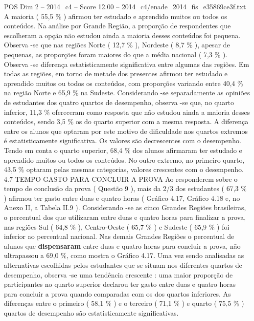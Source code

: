\begin{textsample}{POS Dim 2 – 2014\_c4 – Score 12.00 – 2014\_c4/enade\_2014\_fis\_e35869ce3f.txt}
A maioria ( 55,5 \% ) afirmou ter estudado e aprendido muitos ou todos os conteúdos.
Na análise por Grande Região, a proporção de respondentes que escolheram a opção não estudou ainda a maioria desses conteúdos foi pequena.
Observa -se que nas regiões Norte ( 12,7 \% ), Nordeste ( 8,7 \% ), apesar de pequenas, as proporções foram maiores do que a média nacional ( 7,3 \% ).
Observa -se diferença estatisticamente significativa entre algumas das regiões.
Em todas as regiões, em torno de metade dos presentes afirmou ter estudado e aprendido muitos ou todos os conteúdos, com proporções variando entre 40,4 \% na região Norte e 65,9 \% na Sudeste.
Considerando -se separadamente as opiniões de estudantes dos quatro quartos de desempenho, observa -se que, no quarto inferior, 11,3 \% ofereceram como resposta que não estudou ainda a maioria desses conteúdos, sendo 3,5 \% os do quarto superior com a mesma resposta.
A diferença entre os alunos que optaram por este motivo de dificuldade nos quartos extremos é estatisticamente significativa.
Os valores são decrescentes com o desempenho.
Tendo em conta o quarto superior, 68,4 \% dos alunos afirmaram ter estudado e aprendido muitos ou todos os conteúdos.
No outro extremo, no primeiro quarto, 43,5 \% optaram pelas mesmas categorias, valores crescentes com o desempenho. 4.7 TEMPO GASTO PARA CONCLUIR A PROVA Ao responderem sobre o tempo de conclusão da prova ( Questão 9 ), mais da 2/3 dos estudantes ( 67,3 \% ) afirmou ter gasto entre duas e quatro horas ( Gráfico 4.17, Gráfico 4.18 e, no Anexo II, a Tabela II.9 ).
Considerando -se as cinco Grandes Regiões brasileiras, o percentual dos que utilizaram entre duas e quatro horas para finalizar a prova, nas regiões Sul ( 64,8 \% ), Centro-Oeste ( 65,7 \% ) e Sudeste ( 65,9 \% ) foi inferior ao percentual nacional.
Nas demais Grandes Regiões o percentual de alunos que \textbf{dispensaram} entre duas e quatro horas para concluir a prova, não ultrapassou a 69,0 \%, como mostra o Gráfico 4.17.
Uma vez sendo analisadas as alternativas escolhidas pelos estudantes que se situam nos diferentes quartos de desempenho, observa -se uma tendência crescente : uma maior proporção de participantes no quarto superior declarou ter gasto entre duas e quatro horas para concluir a prova quando comparadas com os dos quartos inferiores.
As diferenças entre o primeiro ( 58,1 \% ) e o terceiro ( 71,1 \% ) e quarto ( 75,5 \% ) quartos de desempenho são estatisticamente significativas.

\end{textsample}
